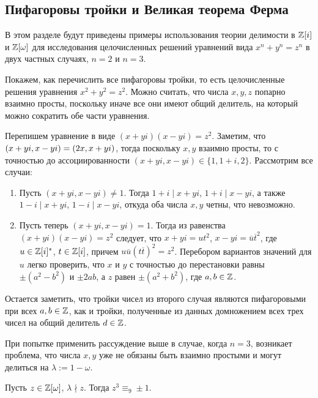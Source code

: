 \subsection{Пифагоровы тройки и Великая теорема Ферма}

В этом разделе будут приведены примеры использования теории делимости в $\mathbb{Z}[i]$ и $\mathbb{Z}[\omega]$ для исследования целочисленных решений уравнений вида $x^n + y^n = z^n$ в двух частных случаях, $n = 2$ и $n = 3$.

\begin{example}
	Покажем, как перечислить все пифагоровы тройки, то есть целочисленные решения уравнения $x^2 + y^2 = z^2$. Можно считать, что числа $x, y, z$ попарно взаимно просты, поскольку иначе все они имеют общий делитель, на который можно сократить обе части уравнения.
	
	Перепишем уравнение в виде $(x+yi)(x-yi) = z^2$. Заметим, что $(x+yi, x-yi) \hm= (2x, x+yi)$, тогда поскольку $x, y$ взаимно просты, то с точностью до ассоциированности $(x+yi, x-yi) \in \{1, 1 + i, 2\}$. Рассмотрим все случаи:
	\begin{enumerate}
		\item Пусть $(x+yi, x-yi) \ne 1$. Тогда $1 + i \mid x + yi$, $1 + i \mid x - yi$, а также $1 - i \mid x + yi$, $1 - i \mid x - yi$, откуда оба числа $x, y$ четны, что невозможно.
		\item Пусть теперь $(x+yi, x-yi) = 1$. Тогда из равенства $(x+yi)(x-yi) = z^2$ следует, что $x+yi = ut^2$, $x-yi = \overline{u}\overline{t}^2$, где $u \in \mathbb{Z}[i]^*$, $t \in \mathbb{Z}[i]$, причем $u\overline{u}(t\overline{t})^2 = z^2$. Перебором вариантов значений для $u$ легко проверить, что $x$ и $y$ с точностью до перестановки равны $\pm(a^2 - b^2)$ и $\pm2ab$, а $z$ равен $\pm(a^2 + b^2)$, где $a, b \in \mathbb{Z}$.
	\end{enumerate}

	Остается заметить, что тройки чисел из второго случая являются пифагоровыми при всех $a, b \in \mathbb{Z}$, как и тройки, полученные из данных домножением всех трех чисел на общий делитель $d \in \mathbb{Z}$.
\end{example}

\begin{note}
	При попытке применить рассуждение выше в случае, когда $n = 3$, возникает проблема, что числа $x, y$ уже не обязаны быть взаимно простыми и могут делиться на $\lambda := 1 - \omega$.
\end{note}

\begin{proposition}
	Пусть $z \in \mathbb{Z}[\omega]$, $\lambda \nmid z$. Тогда $z^3 \equiv_9 \pm1$.
\end{proposition}

